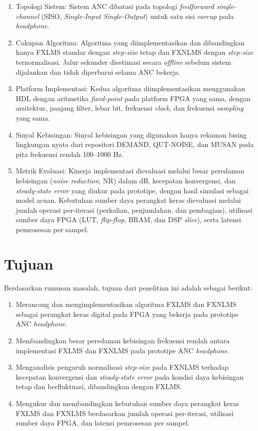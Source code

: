 \begin{enumerate}
  \item Topologi Sistem: Sistem ANC dibatasi pada topologi \emph{feedforward single-channel} (SISO, \emph{Single-Input Single-Output}) untuk satu sisi \emph{earcup} pada \emph{headphone}.
  \item Cakupan Algoritma: Algoritma yang diimplementasikan dan dibandingkan hanya FXLMS standar dengan \emph{step-size} tetap dan FXNLMS dengan \emph{step-size} ternormalisasi. Jalur sekunder diestimasi secara \emph{offline} sebelum sistem dijalankan dan tidak diperbarui selama ANC bekerja.
  \item Platform Implementasi: Kedua algoritma diimplementasikan menggunakan HDL dengan aritmetika \emph{fixed-point} pada platform FPGA yang sama, dengan arsitektur, panjang filter, lebar bit, frekuensi \emph{clock}, dan frekuensi \emph{sampling} yang sama.
  \item Sinyal Kebisingan: Sinyal kebisingan yang digunakan hanya rekaman bising lingkungan nyata dari repositori DEMAND, QUT-NOISE, dan MUSAN pada pita frekuensi rendah 100--1000 Hz.
  \item Metrik Evaluasi: Kinerja implementasi dievaluasi melalui besar peredaman kebisingan (\emph{noise reduction}, NR) dalam dB, kecepatan konvergensi, dan \emph{steady-state error} yang diukur pada prototipe, dengan hasil simulasi sebagai model acuan. Kebutuhan sumber daya perangkat keras dievaluasi melalui jumlah operasi per-iterasi (perkalian, penjumlahan, dan pembagian), utilisasi sumber daya FPGA (LUT, \emph{flip-flop}, BRAM, dan DSP \emph{slice}), serta latensi pemrosesan per sampel.
\end{enumerate}

\section{Tujuan}
\label{sec:tujuan}

Berdasarkan rumusan masalah, tujuan dari penelitian ini adalah sebagai berikut:

\begin{enumerate}
  \item Merancang dan mengimplementasikan algoritma FXLMS dan FXNLMS sebagai perangkat keras digital pada FPGA yang bekerja pada prototipe ANC \emph{headphone}.
  \item Membandingkan besar peredaman kebisingan frekuensi rendah antara implementasi FXLMS dan FXNLMS pada prototipe ANC \emph{headphone}.
  \item Menganalisis pengaruh normalisasi \emph{step-size} pada FXNLMS terhadap kecepatan konvergensi dan \emph{steady-state error} pada kondisi daya kebisingan tetap dan berfluktuasi, dibandingkan dengan FXLMS.
  \item Mengukur dan membandingkan kebutuhan sumber daya perangkat keras FXLMS dan FXNLMS berdasarkan jumlah operasi per-iterasi, utilisasi sumber daya FPGA, dan latensi pemrosesan per sampel.
\end{enumerate}


